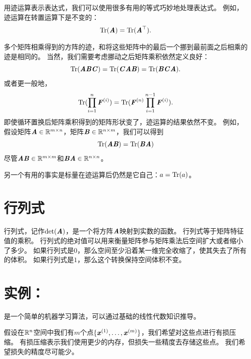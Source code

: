 用迹运算表示表达式，我们可以使用很多有用的等式巧妙地处理表达式。
例如，迹运算在转置运算下是不变的：
\begin{equation}
    \Tr(\MA)=\Tr(\MA^\top).
\end{equation}


多个矩阵相乘得到的方阵的迹，和将这些矩阵中的最后一个挪到最前面之后相乘的迹是相同的。
当然，我们需要考虑挪动之后矩阵乘积依然定义良好：
\begin{equation}
\Tr(\MA\MB\MC)=\Tr(\MC\MA\MB)= \Tr(\MB\MC\MA).
\end{equation}
或者更一般地，
\begin{equation} 
\Tr(\prod_{i=1}^n \MF^{(i)})= \Tr(\MF^{(n)} \prod_{i=1}^{n-1} \MF^{(i)}).
\label{eq:2.52}
\end{equation}
即使循环置换后矩阵乘积得到的矩阵形状变了，迹运算的结果依然不变。
例如，假设矩阵$\MA\in \SetR^{m\times n}$，矩阵$\MB\in \SetR^{n\times m}$，我们可以得到
\begin{equation} 
    \Tr(\MA\MB)= \Tr(\MB\MA)
\end{equation}
尽管$\MA\MB \in \SetR^{m\times m}$和$\MB\MA \in \SetR^{n\times n}$。



另一个有用的事实是标量在迹运算后仍然是它自己：$a=\Tr(a)$。




\section{行列式}
\label{sec:the_determinant}

行列式，记作$\text{det}(\MA)$，是一个将方阵$\MA$映射到实数的函数。
行列式等于矩阵特征值的乘积。
行列式的绝对值可以用来衡量矩阵参与矩阵乘法后空间扩大或者缩小了多少。
如果行列式是$0$，那么空间至少沿着某一维完全收缩了，使其失去了所有的体积。
如果行列式是$1$，那么这个转换保持空间体积不变。




\section{实例：}
\label{sec:example_principal_components_analysis_chap2}

是一个简单的机器学习算法，可以通过基础的线性代数知识推导。


假设在$\SetR^n$空间中我们有$m$个点$\{\Vx^{(1)}, \dots ,\Vx^{(m)}\}$，我们希望对这些点进行有损压缩。
有损压缩表示我们使用更少的内存，但损失一些精度去存储这些点。
我们希望损失的精度尽可能少。


